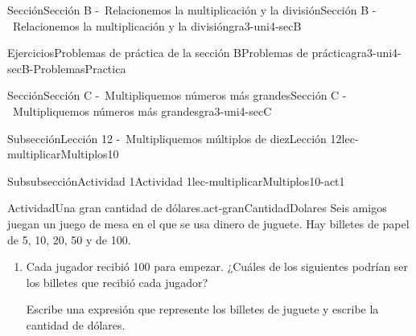 \begin{sectionptx}{Sección}{Sección B -~Relacionemos la multiplicación y la división}{}{Sección B -~Relacionemos la multiplicación y la división}{}{}{gra3-uni4-secB}
%
%
\typeout{************************************************}
\typeout{************************************************}
%
\begin{exercises-subsection}{Ejercicios}{Problemas de práctica de la sección B}{}{Problemas de práctica}{}{}{gra3-uni4-secB-ProblemasPractica}
%
%
%
%
%
%
%
\end{exercises-subsection}
\end{sectionptx}
%
%
\typeout{************************************************}
\typeout{************************************************}
%
\begin{sectionptx}{Sección}{Sección C -~Multipliquemos números más grandes}{}{Sección C -~Multipliquemos números más grandes}{}{}{gra3-uni4-secC}
%
%
\typeout{************************************************}
\typeout{************************************************}
%
\begin{subsectionptx}{Subsección}{Lección 12 -~Multipliquemos múltiplos de diez}{}{Lección 12}{}{}{lec-multiplicarMultiplos10}
%
%
\typeout{************************************************}
\typeout{************************************************}
%
\begin{subsubsectionptx}{Subsubsección}{Actividad 1}{}{Actividad 1}{}{}{lec-multiplicarMultiplos10-act1}
\begin{activity}{Actividad}{Una gran cantidad de dólares.}{act-granCantidadDolares}%
Seis amigos juegan un juego de mesa en el que se usa dinero de juguete. Hay billetes de papel de \textdollar{}5, \textdollar{}10, \textdollar{}20, \textdollar{}50 y de \textdollar{}100.%
%
\begin{enumerate}
\item{}Cada jugador recibió \textdollar{}100 para empezar. ¿Cuáles de los siguientes podrían ser los billetes que recibió cada jugador?%
\par
Escribe una expresión que represente los billetes de juguete y escribe la cantidad de dólares.%
\begin{image}{0}{1}{0}{}%

\end{image}
\end{enumerate}
\end{activity}
\end{subsubsectionptx}
\end{subsectionptx}
\end{sectionptx}
